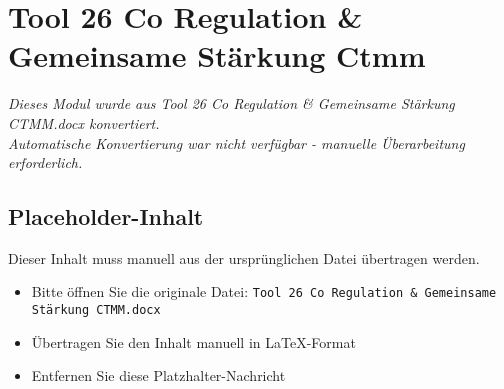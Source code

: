 
\section{Tool 26 Co Regulation & Gemeinsame Stärkung Ctmm}
\label{sec:tool-26-co-regulation-&-gemeinsame-stärkung-ctmm}

\begin{center}
\textit{Dieses Modul wurde aus Tool 26 Co Regulation & Gemeinsame Stärkung CTMM.docx konvertiert.\\
Automatische Konvertierung war nicht verfügbar - manuelle Überarbeitung erforderlich.}
\end{center}


\subsection{Placeholder-Inhalt}

Dieser Inhalt muss manuell aus der ursprünglichen Datei übertragen werden.

\begin{itemize}
\item Bitte öffnen Sie die originale Datei: \texttt{Tool 26 Co Regulation & Gemeinsame Stärkung CTMM.docx}
\item Übertragen Sie den Inhalt manuell in LaTeX-Format
\item Entfernen Sie diese Platzhalter-Nachricht
\end{itemize}
